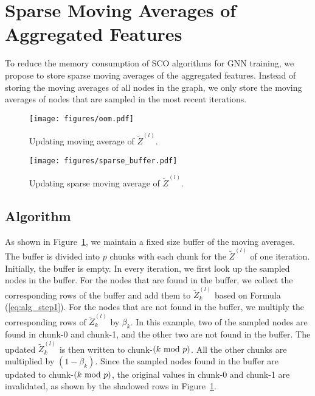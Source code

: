 \section{Sparse Moving Averages of Aggregated Features}
To reduce the memory consumption of SCO algorithms for GNN training, we propose to store sparse moving averages of the aggregated features. 
Instead of storing the moving averages of all nodes in the graph, we only store the moving averages of nodes that are sampled in the most recent iterations. 

\begin{figure}
  \begin{minipage}{.44\linewidth}
    \centering
  \texttt{[image: figures/oom.pdf]}
  \caption{Updating moving average of $\widetilde{Z}^{(l)}$.}
  \label{fig:oom}
\end{minipage} 
\hfill
\begin{minipage}{.52\linewidth}
  \centering
    \texttt{[image: figures/sparse\_buffer.pdf]}
    \caption{Updating sparse moving average of $\widetilde{Z}^{(l)}$.}
    \label{fig:sparse_buffer}
\end{minipage}
\end{figure}

\subsection{Algorithm}
As shown in Figure~\ref{fig:sparse_buffer}, we maintain a fixed size buffer of the moving averages. 
The buffer is divided into $p$ chunks with each chunk for the $\widetilde{Z}^{(l)}$ of one iteration. 
Initially, the buffer is empty. 
In every iteration, we first look up the sampled nodes in the buffer. 
For the nodes that are found in the buffer, we collect the corresponding rows of the buffer and add them to $\widetilde{Z}_k^{(l)}$ based on Formula (\ref{eq:alg_step1}). 
For the nodes that are not found in the buffer, we multiply the corresponding rows of $\widetilde{Z}_k^{(l)}$ by $\beta_k$. 
In this example, two of the sampled nodes are found in chunk-0 and chunk-1, and the other two are not found in the buffer. 
The updated $\widetilde{Z}_k^{(l)}$ is then written to chunk-$(k\ \mathrm{mod}\ p)$.  
All the other chunks are multiplied by $(1-\beta_k)$. 
Since the sampled nodes found in the buffer are updated to chunk-$(k\ \mathrm{mod}\ p)$, the original values in chunk-0 and chunk-1 are invalidated, as shown by the shadowed rows in Figure~\ref{fig:sparse_buffer}. 


